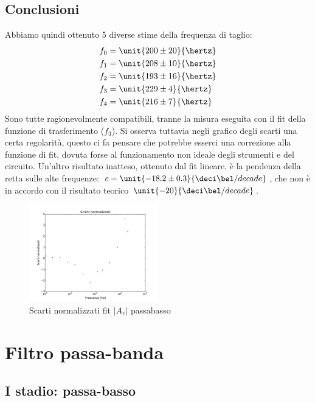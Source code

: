 \documentclass[10pt,a4paper]{article}
\begin{document}
\subsection{Conclusioni}
Abbiamo quindi ottenuto 5 diverse stime della frequenza di taglio:
\begin{align*}
f_0 &= \unit{200 \pm 20}{\hertz}\\
f_1 &=\unit{208 \pm 10}{\hertz}\\
f_2 &=\unit{ 193 \pm 16}{\hertz}\\
f_3 &= \unit{229 \pm 4}{\hertz}\\
f_4 &= \unit{216 \pm 7}{\hertz}\\
\end{align*}
Sono tutte ragionevolmente compatibili, tranne la misura eseguita con il fit della funzione di trasferimento ($f_3$). 
Si osserva tuttavia negli grafico degli scarti una certa regolarità, questo ci fa pensare che potrebbe esserci una correzione alla funzione di fit, dovuta forse al funzionamento non ideale degli strumenti e del circuito.
Un'altro risultato inatteso, ottenuto dal fit lineare, è la pendenza della retta sulle alte frequenze: $c=\unit{-18.2 \pm 0.3}{\deci\bel/decade}$, che non è in accordo con il risultato teorico $\unit{-20}{\deci\bel/decade}$.

\begin{figure}[h!]
	\centering
	\includegraphics[width=0.5\textwidth]{../grafici/scarti_Bode_Lowpass_800ohm.pdf}
	\caption{Scarti normalizzati fit $|A_v|$ passabasso}
	\label{fig:raise}
\end{figure}

\section{Filtro passa-banda}

\subsection{I stadio: passa-basso}
\end{document}
